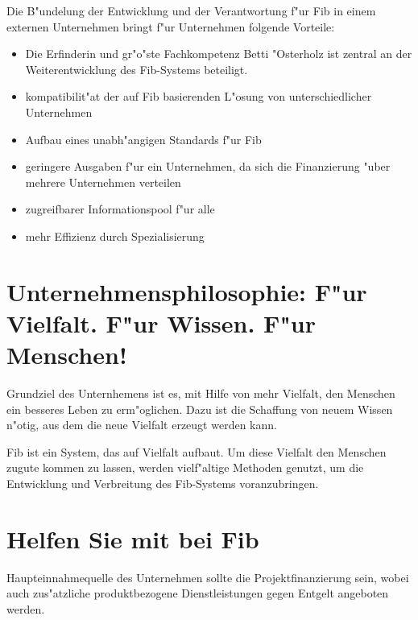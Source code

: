 \documentclass[12pt,a4paper]{article}
\begin{document}
Die B"undelung der Entwicklung und der Verantwortung f"ur Fib in einem externen Unternehmen bringt f"ur Unternehmen folgende Vorteile:
\begin{itemize}
 \item Die Erfinderin und gr"o"ste Fachkompetenz Betti "Osterholz ist zentral an der Weiterentwicklung des Fib-Systems beteiligt.
 \item kompatibilit"at der auf Fib basierenden L"osung von unterschiedlicher Unternehmen
 \item Aufbau eines unabh"angigen Standards f"ur Fib
 \item geringere Ausgaben f"ur ein Unternehmen, da sich die Finanzierung "uber mehrere Unternehmen verteilen
 \item zugreifbarer Informationspool f"ur alle
 \item mehr Effizienz durch Spezialisierung
\end{itemize}


\section{Unternehmensphilosophie: \newline F"ur Vielfalt. F"ur Wissen. F"ur Menschen!}

Grundziel des Unternhemens ist es, mit Hilfe von mehr Vielfalt, den Menschen ein besseres Leben zu erm"oglichen. Dazu ist die Schaffung von neuem Wissen n"otig, aus dem die neue Vielfalt erzeugt werden kann.

Fib ist ein System, das auf Vielfalt aufbaut. Um diese Vielfalt den Menschen zugute kommen zu lassen, werden vielf"altige Methoden genutzt, um die Entwicklung und Verbreitung des Fib-Systems voranzubringen.

\newpage
\section{Helfen Sie mit bei Fib}

Haupteinnahmequelle des Unternehmen sollte die Projektfinanzierung sein, wobei auch zus"atzliche produktbezogene Dienstleistungen gegen Entgelt angeboten werden.
\end{document}
